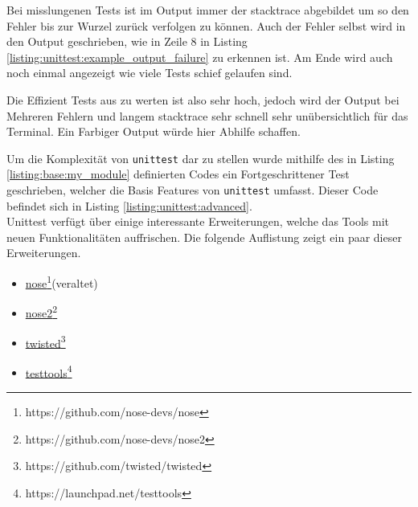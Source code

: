 Bei misslungenen Tests ist im Output immer der \gls{stacktrace} abgebildet um so den Fehler
bis zur Wurzel zurück verfolgen zu können. Auch der Fehler selbst wird in den Output geschrieben,
wie in Zeile 8 in Listing \ref{listing:unittest:example_output_failure} zu erkennen ist. Am
Ende wird auch noch einmal angezeigt wie viele Tests schief gelaufen sind.

Die Effizient Tests aus zu werten ist also sehr hoch, jedoch wird der Output bei Mehreren Fehlern
und langem \gls{stacktrace} sehr schnell sehr unübersichtlich für das Terminal. Ein Farbiger Output
würde hier Abhilfe schaffen.

Um die Komplexität von \lstinline{unittest} dar zu stellen wurde mithilfe des in Listing \ref{listing:base:my_module} definierten Codes ein Fortgeschrittener Test
geschrieben, welcher die Basis Features von \lstinline{unittest} umfasst. Dieser Code
befindet sich in Listing \ref{listing:unittest:advanced}.
\newline
\\
Unittest verfügt über einige interessante Erweiterungen, welche das Tools mit neuen Funktionalitäten auffrischen.
Die folgende Auflistung zeigt ein paar dieser Erweiterungen.
\begin{itemize}
    \item \href{https://github.com/nose-devs/nose}{nose}\footnote{https://github.com/nose-devs/nose}(veraltet)
    \item \href{https://github.com/nose-devs/nose2}{nose2}\footnote{https://github.com/nose-devs/nose2}
    \item \href{https://github.com/twisted/twisted}{twisted}\footnote{https://github.com/twisted/twisted}
    \item \href{https://launchpad.net/testtools}{testtools}\footnote{https://launchpad.net/testtools}
\end{itemize}